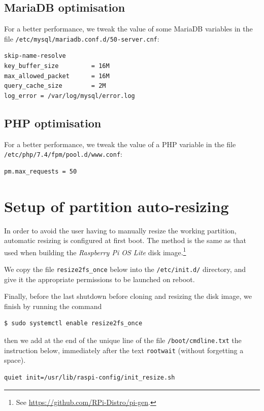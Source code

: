 \documentclass[12pt]{article}
\begin{document}
\subsection{MariaDB optimisation}

For a better performance, we tweak the value of some MariaDB variables in the file \lstinline{/etc/mysql/mariadb.conf.d/50-server.cnf}:
\begin{lstlisting}[language=bash]
skip-name-resolve
key_buffer_size         = 16M
max_allowed_packet      = 16M
query_cache_size        = 2M
log_error = /var/log/mysql/error.log
\end{lstlisting}

\subsection{PHP optimisation}

For a better performance, we tweak the value of a PHP variable in the file \lstinline{/etc/php/7.4/fpm/pool.d/www.conf}:
\begin{lstlisting}[language=bash]
pm.max_requests = 50
\end{lstlisting}

\section{Setup of partition auto-resizing}

In order to avoid the user having to manually resize the working partition, automatic resizing is configured at first boot.
The method is the same as that used when building the \emph{Raspberry Pi OS Lite} disk image.\footnote{See \url{https://github.com/RPi-Distro/pi-gen}.}

We copy the file \lstinline{resize2fs_once} below into the \lstinline{/etc/init.d/} directory, and give it the appropriate permissions to be launched on reboot.


Finally, before the last shutdown before cloning and resizing the disk image, we finish by running the command
\begin{lstlisting}[language=bash]
$ sudo systemctl enable resize2fs_once
\end{lstlisting}
then we add at the end of the unique line of the file \lstinline{/boot/cmdline.txt} the instruction below, immediately after the text \lstinline{rootwait} (without forgetting a space).
\begin{lstlisting}[language=bash]
quiet init=/usr/lib/raspi-config/init_resize.sh
\end{lstlisting}
\end{document}
